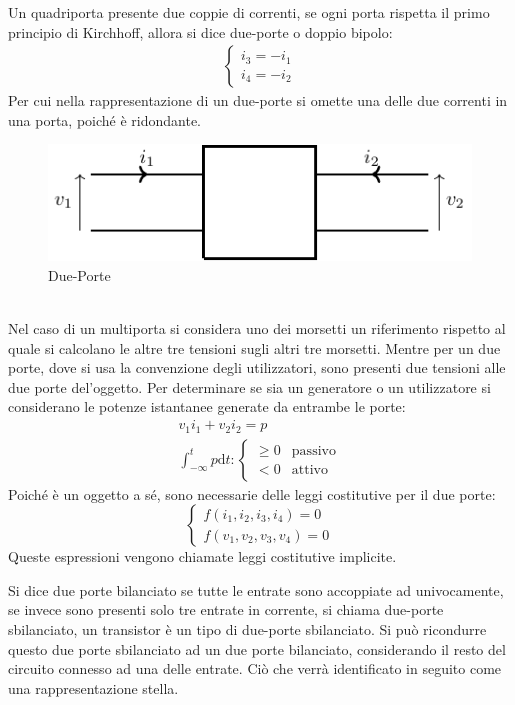 \documentclass{article}
\newcommand{\df}{\mathrm{d}}
\numberwithin{equation}{subsection}
\begin{document}
Un quadriporta presente due coppie di correnti, se ogni porta rispetta il primo principio di Kirchhoff, allora si dice due-porte o doppio bipolo:
\begin{gather*}
    \begin{cases}
        i_3=-i_1\\
        i_4=-i_2
    \end{cases}
\end{gather*}
Per cui nella rappresentazione di un due-porte si omette una delle due correnti in una porta, poiché è ridondante. 
\begin{figure}[ht]%
    \centering
    \includegraphics{due-porte-generico.pdf}
    \caption{Due-Porte}
    \label{fig:due-porte}
\end{figure}
\\
Nel caso di un multiporta si considera uno dei morsetti un riferimento rispetto al quale si calcolano le altre tre tensioni sugli altri tre morsetti. 
Mentre per un due porte, dove si usa la convenzione degli utilizzatori, 
sono presenti due tensioni alle due porte del'oggetto. Per determinare se sia un generatore o un utilizzatore si considerano 
le potenze istantanee generate da entrambe le porte:
\begin{gather*}
    v_1i_1+v_2i_2=p\\
    \displaystyle\int_{-\infty}^tp \df t:\begin{cases}
        \geq0&\mbox{passivo}\\
        <0&\mbox{attivo}
    \end{cases}
\end{gather*} 
Poiché è un oggetto a sé, sono necessarie delle leggi costitutive per il due porte:
\begin{equation*}
    \begin{cases}
        f(i_1,i_2,i_3,i_4)=0\\
        f(v_1,v_2,v_3,v_4)=0
    \end{cases}
\end{equation*}
Queste espressioni vengono chiamate leggi costitutive implicite. 


Si dice due porte bilanciato se tutte le entrate sono accoppiate ad univocamente, se invece sono presenti solo tre entrate in corrente, si chiama due-porte sbilanciato, 
un transistor è un tipo di due-porte sbilanciato. Si può ricondurre questo due porte sbilanciato ad un due porte bilanciato, considerando il resto del circuito connesso 
ad una delle entrate. Ciò che verrà identificato in seguito come una rappresentazione stella. 
\end{document}
